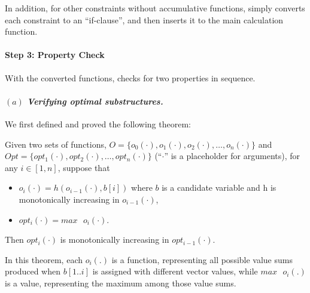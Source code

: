 In addition, for other constraints without accumulative functions, \tool simply converts each constraint to an ``if-clause'', and then inserts it to the main calculation function.




\paragraph{Step 3: Property Check}
With the converted functions, \tool checks for two properties in sequence. 

\paragraph{$(a)$ \emph{Verifying optimal substructures.}}
We first defined and proved the following theorem:

\begin{theorem}
\label{thm1}
Given two sets of functions, $O=\{o_0(\cdot), o_1(\cdot), o_2(\cdot),  \ldots, o_n(\cdot)\}$ and  $Opt=\{opt_1(\cdot), opt_2(\cdot), \ldots, opt_n(\cdot)\}$ (``$\cdot$'' is a placeholder for arguments), for any $i\in[1, n]$, suppose that
\begin{itemize}
    \item $o_i(\cdot)=h(o_{i-1}(\cdot), b[i])$ where $b$ is a candidate variable and h is monotonically increasing in $o_{i-1}(\cdot)$,  
    \item $opt_i(\cdot)=max\text{ }o_i(\cdot)$. 
\end{itemize}
Then $opt_i(\cdot)$ is monotonically increasing in $opt_{i-1}(\cdot)$. 
\end{theorem}

In this theorem, each $o_i(.)$ is a function, representing all possible value sums produced when $b[1..i]$ is assigned with different vector values, while $max\text{ }o_i(.)$ is a value, representing the maximum among those value sums.

